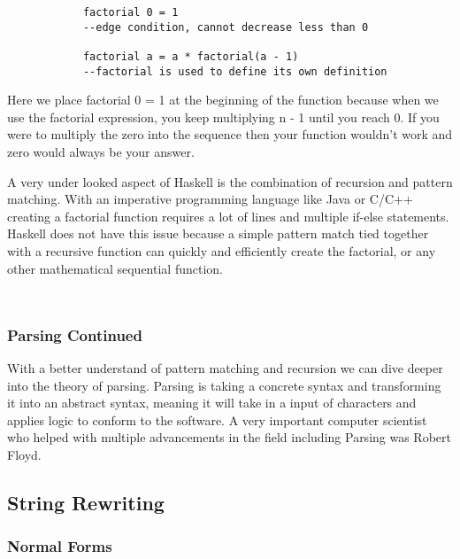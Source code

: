 \documentclass{article}
\begin{document}
        \begin{lstlisting}
            factorial 0 = 1
            --edge condition, cannot decrease less than 0
            
            factorial a = a * factorial(a - 1)
            --factorial is used to define its own definition
        \end{lstlisting}
        
        \noindent Here we place factorial 0 = 1 at the beginning of the function because when we use the factorial expression, you keep multiplying n - 1 until you reach 0. If you were to multiply the zero into the sequence then your function wouldn't work and zero would always be your answer. 
        
        \medskip
        \noindent A very under looked aspect of Haskell is the combination of recursion and pattern matching. With an imperative programming language like Java or C/C++ creating a factorial function requires a lot of lines and multiple if-else statements. Haskell does not have this issue because a simple pattern match tied together with a recursive function can quickly and efficiently create the factorial, or any other mathematical sequential function.
        
        \begin{lstlisting}
            
        \end{lstlisting}
        
        \subsubsection{Parsing Continued}
        With a better understand of pattern matching and recursion we can dive deeper into the theory of parsing. Parsing is taking a concrete syntax and transforming it into an abstract syntax, meaning it will take in a input of characters and applies logic to conform to the software. A very important computer scientist who helped with multiple advancements in the field including Parsing was Robert Floyd.
        
\subsection{String Rewriting}

    \subsubsection{Normal Forms}
    
\end{document}

